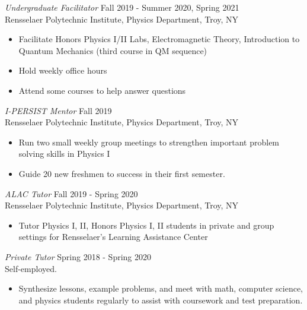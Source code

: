 \documentclass[margin]{rpires}
\begin{document}
\begin{resume}
    {\sl Undergraduate Facilitator} \hfill Fall 2019 - Summer 2020, Spring 2021 \\
    Rensselaer Polytechnic Institute, Physics Department, Troy, NY
    \begin{itemize}  \itemsep -2pt %
        \item Facilitate Honors Physics I/II Labs, Electromagnetic Theory, Introduction to Quantum Mechanics (third course in QM sequence)
        \item Hold weekly office hours
        \item Attend some courses to help answer questions
    \end{itemize}

    {\sl I-PERSIST Mentor} \hfill Fall 2019 \\
    Rensselaer Polytechnic Institute, Physics Department, Troy, NY
    \begin{itemize}  \itemsep -2pt %
        \item Run two small weekly group meetings to strengthen important problem solving skills in Physics I 
        \item Guide 20 new freshmen to success in their first semester.
    \end{itemize}

    {\sl ALAC Tutor} \hfill Fall 2019 - Spring 2020 \\
    Rensselaer Polytechnic Institute, Physics Department, Troy, NY
    \begin{itemize}  \itemsep -2pt %
        \item Tutor Physics I, II, Honors Physics I, II students in private and group settings for Rensselaer's Learning Assistance Center
    \end{itemize}

    {\sl Private Tutor} \hfill Spring 2018 - Spring 2020 \\
    Self-employed.
    \begin{itemize}  \itemsep -2pt %
        \item Synthesize lessons, example problems, and meet with math, computer science, and physics students regularly to assist with coursework and test preparation.
    \end{itemize}
    
    

\end{resume}
\end{document}
